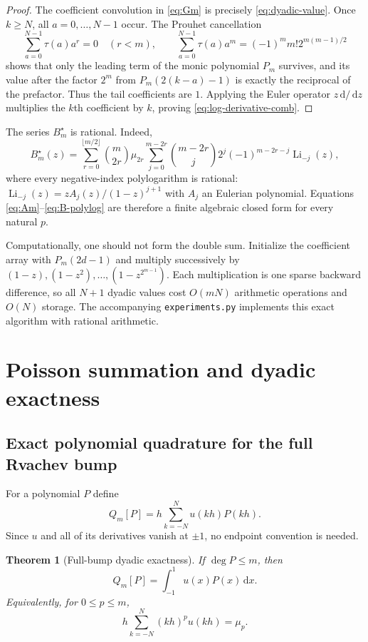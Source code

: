 \documentclass[11pt]{article}
\newtheorem{theorem}{Theorem}[section]
\theoremstyle{definition}
\theoremstyle{remark}
\newcommand{\Li}{\operatorname{Li}}
\newcommand{\tm}{\tau}
\newcommand{\dd}{\,\mathrm d}
\begin{document}
\begin{proof}
The coefficient convolution in \eqref{eq:Gm} is precisely
\eqref{eq:dyadic-value}.  Once $k\ge N$, all $a=0,\ldots,N-1$ occur.  The
Prouhet cancellation
\[
 \sum_{a=0}^{N-1}\tm(a)a^r=0\quad(r<m),
 \qquad
 \sum_{a=0}^{N-1}\tm(a)a^m
 =(-1)^m m!2^{m(m-1)/2}
\]
shows that only the leading term of the monic polynomial $P_m$ survives, and
its value after the factor $2^m$ from $P_m(2(k-a)-1)$ is exactly the reciprocal
of the prefactor.  Thus the tail coefficients are $1$.  Applying the Euler
operator $z\dd/\dd z$ multiplies the $k$th coefficient by $k$, proving
\eqref{eq:log-derivative-comb}.
\end{proof}

The series $B_m^\star$ is rational.  Indeed,
\begin{equation}\label{eq:B-polylog}
 B_m^\star(z)=
 \sum_{r=0}^{\lfloor m/2\rfloor}\binom m{2r}\mu_{2r}
 \sum_{j=0}^{m-2r}\binom{m-2r}{j}2^j(-1)^{m-2r-j}\Li_{-j}(z),
\end{equation}
where every negative-index polylogarithm is rational:
\(
 \Li_{-j}(z)=zA_j(z)/(1-z)^{j+1}
\)
with $A_j$ an Eulerian polynomial.  Equations
\eqref{eq:Am}--\eqref{eq:B-polylog} are therefore a finite algebraic closed
form for every natural $p$.

Computationally, one should not form the double sum.  Initialize the coefficient
array with $P_m(2d-1)$ and multiply successively by
$(1-z),(1-z^2),\ldots,(1-z^{2^{m-1}})$.  Each multiplication is one sparse
backward difference, so all $N+1$ dyadic values cost $O(mN)$ arithmetic
operations and $O(N)$ storage.  The accompanying \texttt{experiments.py}
implements this exact algorithm with rational arithmetic.

\section{Poisson summation and dyadic exactness}

\subsection{Exact polynomial quadrature for the full Rvachev bump}

For a polynomial $P$ define
\[
 Q_m[P]=h\sum_{k=-N}^{N}u(kh)P(kh).
\]
Since $u$ and all of its derivatives vanish at $\pm1$, no endpoint convention
is needed.

\begin{theorem}[Full-bump dyadic exactness]\label{thm:up-exactness}
If $\deg P\le m$, then
\begin{equation}\label{eq:up-exactness}
 Q_m[P]=\int_{-1}^{1}u(x)P(x)\dd x.
\end{equation}
Equivalently, for $0\le p\le m$,
\begin{equation}\label{eq:up-monomial}
 h\sum_{k=-N}^{N}(kh)^pu(kh)=\mu_p.
\end{equation}
\end{theorem}
\end{document}
